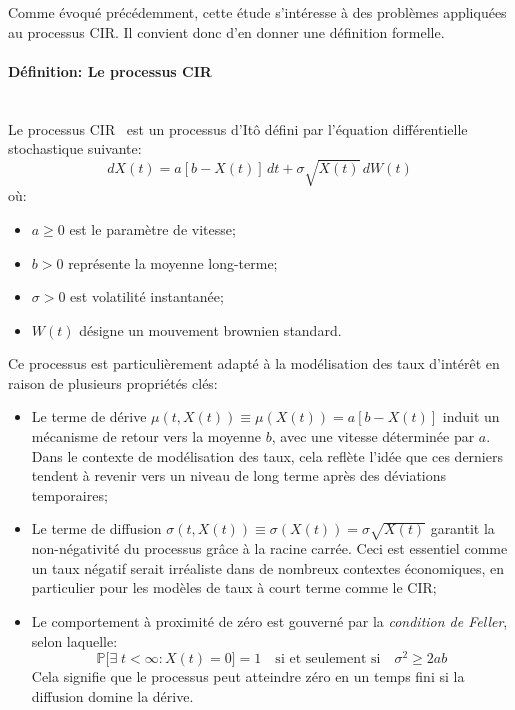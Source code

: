 Comme évoqué précédemment, cette étude s'intéresse à des problèmes appliquées au processus \acl{CIR}. Il convient donc d'en donner une définition formelle.
\paragraph{Définition: Le processus \acl{CIR}}\mbox{}\\
Le processus \ac{CIR}~\cite{cox1985} est un processus d'Itô défini par l'équation différentielle stochastique suivante:
\begin{equation}
    dX(t) = a[b - X(t)]\,dt + \sigma \sqrt{X(t)}\,dW(t)
\end{equation}\label{cir_eq}
où:
\begin{itemize}
    \item $a \geq 0$ est le paramètre de vitesse;
    \item $b > 0$ représente la moyenne long-terme;
    \item $\sigma > 0$ est volatilité instantanée;
    \item $W(t)$ désigne un mouvement brownien standard.
\end{itemize}
Ce processus est particulièrement adapté à la modélisation des taux d'intérêt en raison de plusieurs propriétés clés:
\begin{itemize}
    \item Le terme de dérive $\mu(t, X(t)) \equiv \mu(X(t))= a[b - X(t)]$ induit un mécanisme de retour vers la moyenne $b$, avec une vitesse déterminée par $a$. Dans le contexte de modélisation des taux, cela reflète l'idée que ces derniers tendent à revenir vers un niveau de long terme après des déviations temporaires;
    \item Le terme de diffusion $\sigma(t, X(t))\equiv \sigma(X(t)) = \sigma \sqrt{X(t)}$ garantit la non-négativité du processus grâce à la racine carrée. Ceci est essentiel comme un taux négatif serait irréaliste dans de nombreux contextes économiques, en particulier pour les modèles de taux à court terme comme le CIR;
    \item Le comportement à proximité de zéro est gouverné par la \textit{condition de Feller}, selon laquelle:
    \[
    \mathds{P} \Big[ \exists\;t < \infty:X(t) = 0 \Big] = 1 \quad \text{si et seulement si} \quad \sigma^2 \geq 2ab
    \]
    Cela signifie que le processus peut atteindre zéro en un temps fini si la diffusion domine la dérive.
\end{itemize}
